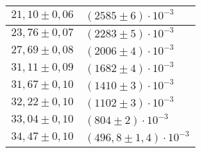 \begin{tabular}{|l|l|}
$21{,}10 \pm 0{,}06$ & $\left(2585 \pm 6\right)\cdot 10^{-3}$\\\hline
$23{,}76 \pm 0{,}07$ & $\left(2283 \pm 5\right)\cdot 10^{-3}$\\\hline
$27{,}69 \pm 0{,}08$ & $\left(2006 \pm 4\right)\cdot 10^{-3}$\\\hline
$31{,}11 \pm 0{,}09$ & $\left(1682 \pm 4\right)\cdot 10^{-3}$\\\hline
$31{,}67 \pm 0{,}10$ & $\left(1410 \pm 3\right)\cdot 10^{-3}$\\\hline
$32{,}22 \pm 0{,}10$ & $\left(1102 \pm 3\right)\cdot 10^{-3}$\\\hline
$33{,}04 \pm 0{,}10$ & $\left(804 \pm 2\right)\cdot 10^{-3}$\\\hline
$34{,}47 \pm 0{,}10$ & $\left(496{,}8 \pm 1{,}4\right)\cdot 10^{-3}$\\\hline
\end{tabular}
